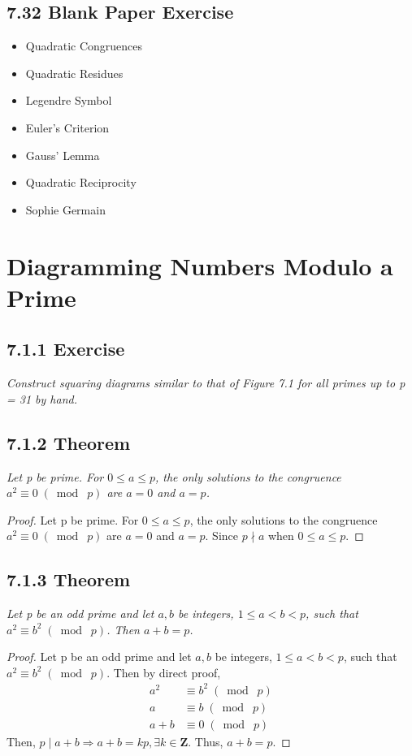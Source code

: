 \documentclass{article}
\begin{document}
\subsection*{7.32 Blank Paper Exercise} 
\begin{itemize}
    \item Quadratic Congruences
    \item Quadratic Residues
    \item Legendre Symbol
    \item Euler's Criterion
    \item Gauss' Lemma
    \item Quadratic Reciprocity
    \item Sophie Germain
\end{itemize}

\section*{Diagramming Numbers Modulo a Prime}

\subsection*{7.1.1 Exercise} 
\quad \textit{Construct squaring diagrams similar to that of Figure 7.1 for all primes up to p = 31 by hand.}

\subsection*{7.1.2 Theorem} 
\quad \textit{Let p be prime. For $0 \leq a \leq p$, the only solutions to the congruence $a^2 \equiv 0 \;(\bmod\; p)$ are $a=0$ and $a=p$.}

\begin{proof}
Let p be prime. For $0 \leq a \leq p$, the only solutions to the congruence $a^2 \equiv 0 \;(\bmod\; p)$ are $a=0$ and $a=p$. Since $p \nmid a$ when $0 \leq a \leq p$.
\end{proof}

\subsection*{7.1.3 Theorem} 
\quad \textit{Let p be an odd prime and let $a,b$ be integers, $1 \leq a < b < p$, such that $a^2 \equiv b^2 \;(\bmod\; p)$. Then $a+b = p$.}

\begin{proof}
Let p be an odd prime and let $a,b$ be integers, $1 \leq a < b < p$, such that $a^2 \equiv b^2 \;(\bmod\; p)$. Then by direct proof,
\begin{align*}
    &&a^2 &\equiv b^2 \;(\bmod\; p) &&\\
    &&a &\equiv b \;(\bmod\; p) &&\\
    &&a + b &\equiv 0 \;(\bmod\; p) &&
\end{align*}
Then, $p\mid a+b \Longrightarrow a+b = kp, \exists k \in \mathbf{Z}$. Thus, $a+b = p$.
\end{proof}
\end{document}
